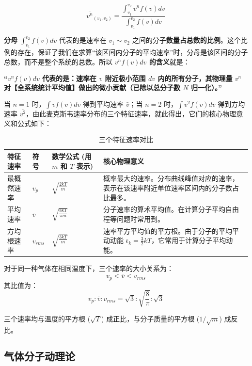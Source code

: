 \documentclass[UTF8]{ctexbook}
\begin{document}
\[
\overline{v^n}_{(v_1, v_2)} = \frac{\int_{v_1}^{v_2} v^n f(v) dv}{\int_{v_1}^{v_2} f(v) dv}
\]

\textbf{分母 \(\int_{v_1}^{v_2} f(v) dv\)} 代表的是速率在 \(v_1 \sim v_2\) 之间的分子\textbf{数量占总数的比例}。这个比例的存在，保证了我们在求算“该区间内分子的平均速率”时，分母是该区间的分子总数，而不是整个系统的总数。所以\textbf{ \(v^n f(v)dv\) 的含义}就是：
\begin{center}
    \textbf{“\(v^n f(v)dv\) 代表的是：速率在 \(v\) 附近极小范围 \(dv\) 内的所有分子，其物理量 \(v^n\) 对【全系统统计平均值】做出的微小贡献（已除以总分子数 \(N\) 归一化）。”}
\end{center}
当 \(n=1\) 时，\(\int v f(v) dv\) 得到平均速率 \(\bar{v}\)；当 \(n=2\) 时，\(\int v^2 f(v) dv\) 得到方均速率 \(\overline{v^2}\)，由此麦克斯韦速率分布的三个特征速率，就此得出，它们的核心物理意义和公式如下：

\begin{table}[H]
\centering
\caption{三个特征速率对比}
\begin{tabular}{>{\centering\arraybackslash}m{2.5cm} >{\centering\arraybackslash}m{2.5cm} >{\centering\arraybackslash}m{5cm} >{\arraybackslash}m{5cm}}
\toprule
\textbf{特征速率} & \textbf{符号} & \textbf{数学公式 (用 \(m\) 和 \(T\) 表示)} & \textbf{核心物理意义} \\
\midrule
最概然速率 & \(v_p\) & \(\sqrt{\frac{2kT}{m}}\) & 概率最大的速率。分布曲线峰值对应的速率，表示在该速率附近单位速率区间内的分子数占比最多。 \\
平均速率 & \(\bar{v}\) & \(\sqrt{\frac{8kT}{\pi m}}\) & 分子速率的算术平均值。在计算分子平均自由程等问题时常用到。 \\
方均根速率 & \(v_{rms}\) & \(\sqrt{\frac{3kT}{m}}\) & 速率平方平均值的平方根。由于分子的平均平动动能 \(\bar{\epsilon}_k = \frac{3}{2}kT\)，它常用于计算分子平均动能。 \\
\bottomrule
\end{tabular}
\end{table}


对于同一种气体在相同温度下，三个速率的大小关系为：
\[
v_p < \bar{v} < v_{rms}
\]
其比值为：
\[
v_p : \bar{v} : v_{rms} = \sqrt{3} : \sqrt{\frac{8}{\pi}} : \sqrt{3} 
\]

三个速率均与温度的平方根 (\(\sqrt{T}\)) 成正比，与分子质量的平方根 (\(1/\sqrt{m}\)) 成反比。



\subsection{气体分子动理论}
\end{document}
